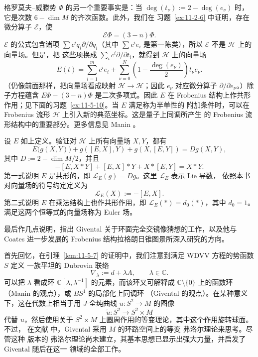 格罗莫夫--威滕势 $\Phi$ 的另一个重要事实是：当
$\deg(t_\nu):=2-\deg(e_\nu)$ 时，它是次数 $6-\dim M$ 的齐次函数。此外，我们在
习题~\ref{ex:11-2-6} 中证明，存在微分算子 $\mathcal E$，使
\[
  \mathcal E\Phi=(3-n)\Phi.
\]
$\mathcal E$ 的公式包含诸项 $\sum c^iq_i\partial/\partial q_i$（其中
$\sum c^i e_i$ 是第一陈类），所以 $\mathcal E$ 不是 $\mathcal H$ 上的向量场。但是，把
这些项换成 $\sum_i c^i\partial/\partial t_i$，就得到 $\mathcal H$ 上的向量场
\[
  E(t)=\sum_{i=1}^m c^i e_i
  +\sum_{\nu=0}^N\left(1-\frac{\deg(e_\nu)}2\right)t_\nu e_\nu.
\]
（仍像前面那样，把向量场看成映射 $\mathcal H\to\mathcal H$；因此 $e_\nu$ 对应微分算子
$\partial/\partial e_\nu$。）除子方程蕴含 $E\Phi-(3-n)\Phi$ 是二次多项式。因此 $E$ 在
Frobenius 结构上作共形作用；见下面的习题~\ref{ex:11-5-10}。当 $E$ 满足称为半单性的
附加条件时，可以在 Frobenius 流形 $\mathcal H$ 上引入新的典范坐标。这是量子上同调所产生
的 Frobenius 流形结构中的重要部分。更多信息见 Manin 。

\begin{exercise}\label{ex:11-5-10}
设 $E$ 如上定义。验证对 $\mathcal H$ 上所有向量场 $X,Y$，都有
\[
  E\bigl(g(X,Y)\bigr)+g([E,X],Y)+g(X,[E,Y])=Dg(X,Y),
\]
其中 $D:=2-\dim M/2$，并且
\[
  -[E,X*Y]+[E,X]*Y+X*[E,Y]=X*Y.
\]
第一式说明 $E$ 是共形的，即 $\mathcal L_E(g)=Dg$。这里 $\mathcal L_E$ 表示 Lie 导数，
依照本书对向量场的符号约定定义为
\[
  \mathcal L_E(X):=-[E,X].
\]
第二式说明 $E$ 在乘法结构上也作共形作用，即
$\mathcal L_E(*)=d_0(*)$，其中 $d_0=1$。满足这两个恒等式的向量场称为 Euler 场。
\end{exercise}

最后作几点说明，指出 Givental  关于环面完全交镜像猜想的工作，以及他与
Coates  进一步发展的 Frobenius 结构拉格朗日锥图景所深入研究的方向。

首先回忆，在引理~\ref{lem:11-5-7} 的证明中，我们注意到满足 WDVV 方程的势函数 $S$ 定义
一族平坦的 Dubrovin 联络
\[
  \nabla_\lambda:=d+\lambda A,
  \qquad \lambda\in\mathbb C.
\]
可以把 $\lambda$ 看成环 $\mathbb C[\lambda,\lambda^{-1}]$ 的元素，而该环又可解释成
$\mathbb C\setminus\{0\}$ 上的函数环（Manin 的观点），或 $BS^1$ 的局部化上同调环
（Givental 的观点）。在某种意义下，这在代数上相当于用 $J$-全纯曲线
$u:S^2\to M$ 的图像
\[
  \widetilde u:S^2\longrightarrow S^2\times M
\]
代替 $u$，然后使用关于 $S^2\times M$ 上圆周作用的等变理论，其中这个作用旋转球面。不过，
在文献  中，Givental 采用 $M$ 的环路空间上的等变 弗洛尔理论来思考。尽管这种
版本的 弗洛尔理论尚未建立，其基本思想已显示出强大力量，并启发了 Givental 随后在这一
领域的全部工作。

